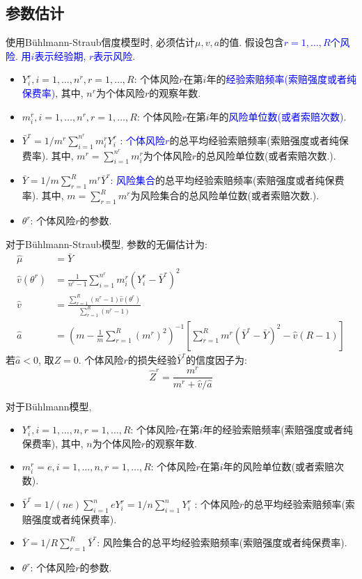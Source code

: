 \documentclass[professionalfont]{beamer}
\newcommand{\blue}[1]{\textcolor{blue}{#1}}
\begin{document}
\subsection{参数估计}
\begin{frame}
使用B\"uhlmann-Straub信度模型时, 必须估计$\mu, v, a$的值. 假设包含\blue{$r=1,\ldots, R$个风险}. \blue{用$i$表示经验期, $r$表示风险}.
\begin{itemize}
\item $Y_i^r, i=1,\ldots, n^r, r=1,\ldots, R$: 个体风险$r$在第$i$年的\blue{经验索赔频率(索赔强度或者纯保费率)}, 其中, $n^r$为个体风险$r$的观察年数.
\item  $m_i^r, i=1,\ldots, n^r, r=1,\ldots, R$: 个体风险$r$在第$i$年的\blue{风险单位数(或者索赔次数)}.
\item $\bar{Y}^r=1/m^r\sum_{i=1}^{n^r}m_i^rY_i^r$ : \blue{个体风险$r$}的总平均经验索赔频率(索赔强度或者纯保费率). 其中, $m^r=\sum_{i=1}^{n^r}m_i^r$为个体风险$r$的总风险单位数(或者索赔次数.).
\item $\bar{Y}=1/m\sum_{r=1}^{R}m^r\bar{Y}^r$: \blue{风险集合}的总平均经验索赔频率(索赔强度或者纯保费率). 其中, $m=\sum_{r=1}^{R}m^r$为风险集合的总风险单位数(或者索赔次数.).
\item $\theta^r$: 个体风险$r$的参数.
\end{itemize}
\end{frame}

\begin{frame}
对于B\"uhlmann-Straub模型, 参数的无偏估计为: 
\begin{equation*}
\begin{aligned}
\hat{\mu}&=\bar{Y}\\
\hat{v}(\theta^r)&=\frac{1}{n^r-1}\sum_{i=1}^{n^r}m_i^r(Y_i^r-\bar{Y}^r)^2\\
\hat{v}&=\frac{\sum_{r=1}^R(n^r-1)\hat{v}(\theta^r)}{\sum_{r=1}^R (n^r-1)}\\
\hat{a}&=\left(m-\frac{1}{m}\sum_{r=1}^R(m^r)^2\right)^{-1}\left[\sum_{r=1}^Rm^r(\bar{Y}^r-\bar{Y})^2-\hat{v}(R-1)\right]
\end{aligned}
\end{equation*}
若$\hat{a}<0$, 取$Z=0$. 个体风险$r$的损失经验$\bar{Y}^r$的信度因子为:
$$\hat{Z}^r=\frac{m^r}{m^r+\hat{v}/\hat{a}}$$

\end{frame}

\begin{frame}
对于B\"uhlmann模型, 
\begin{itemize}
\item $Y_i^r, i=1,\ldots, n, r=1,\ldots, R$: 个体风险$r$在第$i$年的经验索赔频率(索赔强度或者纯保费率), 其中, $n$为个体风险$r$的观察年数.
\item  $m_i^r=e, i=1,\ldots, n, r=1,\ldots, R$: 个体风险$r$在第$i$年的风险单位数(或者索赔次数).
\item $\bar{Y}^r=1/(ne)\sum_{i=1}^{n}eY_i^r=1/n\sum_{i=1}^{n}Y_i^r$ : 个体风险$r$的总平均经验索赔频率(索赔强度或者纯保费率). 
\item $\bar{Y}=1/R\sum_{r=1}^{R}\bar{Y}^r$: 风险集合的总平均经验索赔频率(索赔强度或者纯保费率). 
\item $\theta^r$: 个体风险$r$的参数.
\end{itemize}
\end{frame}
\end{document}
